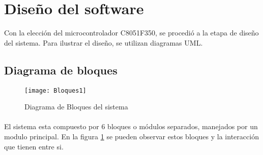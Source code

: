 \section{Diseño del software} %
\label{sec:diseno_del_software}


Con la elección del microcontrolador C8051F350, se procedió a la etapa de diseño del sistema. Para ilustrar el diseño, se utilizan diagramas UML.

\subsection{Diagrama de bloques} %
\label{sub:diagrama_de_bloques}

\begin{figure}[h]
  \centering
  \texttt{[image: Bloques1]}
  \caption{Diagrama de Bloques del sistema}\label{fig:bloques1}
\end{figure}

\paragraph{}
El sistema esta compuesto por 6 bloques o módulos separados, manejados por un modulo principal. En la figura \ref{fig:bloques1} se pueden observar estos bloques y la interacción que tienen entre si. 
\paragraph{}



